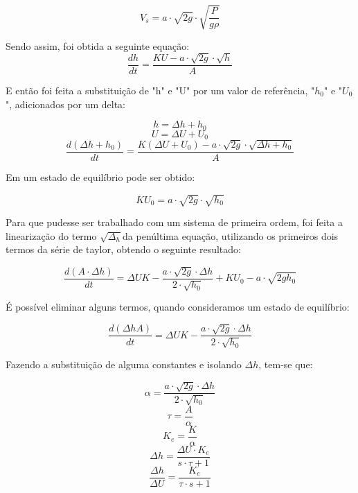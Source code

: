 \begin{equation}
    V_s = a\cdot \sqrt{2g} \cdot \sqrt{\dfrac{P}{g \rho}}
\end{equation}

Sendo assim, foi obtida a seguinte equação:
\begin{equation}
    \dfrac{dh}{dt} = \dfrac{KU - a\cdot \sqrt{2g} \cdot \sqrt{h}}{A}
\end{equation}

E então foi feita a substituição de "h" e "U" por um valor de referência, "$h_0$" e "$U_0$", adicionados por um delta:

\begin{equation}
    h = \Delta h + h_0
\end{equation}
\begin{equation}
    U = \Delta U + U_0
\end{equation}
\begin{equation}
    \dfrac{d(\Delta h + h_0)}{dt} = \dfrac{K(\Delta U + U_0) - a\cdot \sqrt{2g} \cdot \sqrt{\Delta h + h_0}}{A}
\end{equation}

Em um estado de equilíbrio pode ser obtido:

\begin{equation}
    KU_0 = a\cdot \sqrt{2g} \cdot \sqrt{ h_0}
\end{equation}

Para que pudesse ser trabalhado com um sistema de primeira ordem, foi feita a linearização do termo $\sqrt{\Delta_h}$da penúltima equação, utilizando os primeiros dois termos da série de taylor, obtendo o seguinte resultado:

\begin{equation}
    \dfrac{d(A\cdot \Delta h)}{dt} = \Delta UK - \dfrac{a\cdot \sqrt{2g} \cdot \Delta h}{2 \cdot \sqrt{h_0}} + KU_0 - a \cdot \sqrt{2gh_0}
\end{equation}

É possível eliminar alguns termos, quando consideramos um estado de equilíbrio:

\begin{equation}
    \dfrac{d(\Delta h A)}{dt} = \Delta UK - \dfrac{a\cdot \sqrt{2g} \cdot \Delta h}{2 \cdot \sqrt{h_0}}
\end{equation}

Fazendo a substituição de alguma constantes e isolando $\Delta h$, tem-se que:

\begin{equation}
    \alpha = \dfrac{a\cdot \sqrt{2g} \cdot \Delta h}{2 \cdot \sqrt{h_0}}
\end{equation}
\begin{equation}
    \tau = \dfrac{A}{\alpha}
\end{equation}
\begin{equation}
    K_e = \dfrac{K}{\alpha}
\end{equation}
\begin{equation}
    \Delta h = \dfrac{\Delta U \cdot K_e}{s\cdot \tau + 1}
\end{equation}
\begin{equation}
    \dfrac{\Delta h}{\Delta U} = \dfrac{K_e}{\tau\cdot s + 1}
\end{equation}

